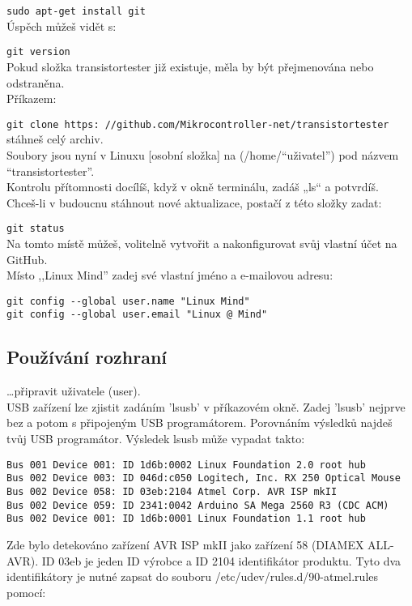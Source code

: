 \verb"sudo apt-get install git"\\
Úspěch můžeš vidět s:

\verb"git version"\\
Pokud složka transistortester již existuje, měla by být přejmenována nebo odstraněna. \\
Příkazem:

\verb"git clone https: //github.com/Mikrocontroller-net/transistortester"\\
stáhneš celý archiv. \\
Soubory jsou nyní v Linuxu [osobní složka] na (/home/"`uživatel"') pod názvem "`transistortester"'.\\
Kontrolu přítomnosti docílíš, když v okně terminálu, zadáš „ls“ a potvrdíš. \\
Chceš-li v budoucnu stáhnout nové aktualizace, postačí z této složky zadat:

\verb"git status"\\
Na tomto místě můžeš, volitelně vytvořit a nakonfigurovat svůj vlastní účet na GitHub. \\
Místo ,,Linux Mind'' zadej své vlastní jméno a e-mailovou adresu:

\verb|git config --global user.name "Linux Mind" |\\
\verb|git config --global user.email "Linux @ Mind" |\\

\subsection{Používání rozhraní}

\dots připravit uživatele (user). \\
USB zařízení lze zjistit zadáním 'lsusb' v příkazovém okně.
Zadej 'lsusb' nejprve bez a potom s připojeným USB programátorem. 
Porovnáním výsledků najdeš tvůj USB programátor.
Výsledek lsusb může vypadat takto:
\begin{verbatim}
Bus 001 Device 001: ID 1d6b:0002 Linux Foundation 2.0 root hub
Bus 002 Device 003: ID 046d:c050 Logitech, Inc. RX 250 Optical Mouse
Bus 002 Device 058: ID 03eb:2104 Atmel Corp. AVR ISP mkII
Bus 002 Device 059: ID 2341:0042 Arduino SA Mega 2560 R3 (CDC ACM)
Bus 002 Device 001: ID 1d6b:0001 Linux Foundation 1.1 root hub
\end{verbatim}
Zde bylo detekováno zařízení AVR ISP mkII jako zařízení 58 (DIAMEX ALL-AVR).
ID 03eb je jeden ID výrobce a ID 2104 identifikátor produktu.
Tyto dva identifikátory je nutné zapsat do souboru /etc/udev/rules.d/90-atmel.rules pomocí:

